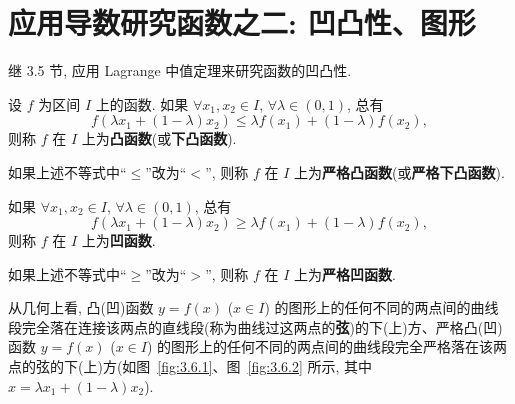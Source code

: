 \section{应用导数研究函数之二: 凹凸性、图形}\label{sec:3.6}

继 3.5 节, 应用 Lagrange 中值定理来研究函数的凹凸性.

\begin{definition}\label{def:3.6.1}
设 $f$ 为区间 $I$ 上的函数. 如果 $\forall x_{1},x_{2}\in I$, $\forall \lambda\in (0,1)$, 总有
\[
f(\lambda x_{1}+(1-\lambda)x_{2})\leqslant \lambda f(x_{1})+(1-\lambda)f(x_{2}),
\]
则称 $f$ 在 $I$ 上为\textbf{凸函数}(或\textbf{下凸函数}).

如果上述不等式中“$\leqslant$”改为“$<$”, 则称 $f$ 在 $I$ 上为\textbf{严格凸函数}(或\textbf{严格下凸函数}).

如果 $\forall x_{1},x_{2}\in I$, $\forall \lambda\in (0,1)$, 总有
\[
f(\lambda x_{1}+(1-\lambda)x_{2})\geqslant \lambda f(x_{1})+(1-\lambda)f(x_{2}),
\]
则称 $f$ 在 $I$ 上为\textbf{凹函数}.

如果上述不等式中“$\geqslant$”改为“$>$”, 则称 $f$ 在 $I$ 上为\textbf{严格凹函数}.
\end{definition}

从几何上看, 凸(凹)函数 $y=f(x)$ ($x\in I$) 的图形上的任何不同的两点间的曲线段完全落在连接该两点的直线段(称为曲线过这两点的\textbf{弦})的下(上)方、严格凸(凹)函数 $y=f(x)$ ($x\in I$) 的图形上的任何不同的两点间的曲线段完全严格落在该两点的弦的下(上)方(如图~\ref{fig:3.6.1}、图~\ref{fig:3.6.2} 所示, 其中 $x=\lambda x_{1}+(1-\lambda)x_{2}$).

